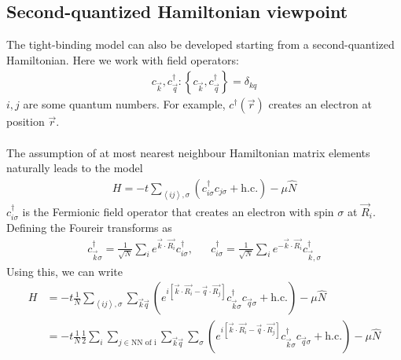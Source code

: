 \documentclass[12pt]{article}
\numberwithin{equation}{section}
\begin{document}
\subsection*{Second-quantized Hamiltonian viewpoint}
The tight-binding model can also be developed starting from a second-quantized Hamiltonian. Here we work with field operators:
\begin{equation}\begin{aligned}
	c_{\vec k}, c_{\vec q}^\dagger: \left\{ c_{\vec k}, c^\dagger_{\vec q} \right\} = \delta_{kq}
\end{aligned}\end{equation}
\(i,j\) are some quantum numbers. For example, \(c^\dagger(\vec r)\) creates an electron at position \(\vec r\).
\\\\
The assumption of at most nearest neighbour Hamiltonian matrix elements naturally leads to the model
\begin{equation}\begin{aligned}
	H = -t\sum_{\left<ij\right>, \sigma}\left(c^\dagger_{i \sigma}c_{j\sigma} + \text{h.c.}\right) - \mu \hat N
\end{aligned}\end{equation}
\(c^\dagger_{i\sigma}\) is the Fermionic field operator that creates an electron with spin \(\sigma\) at \(\vec R_i\). Defining the Foureir transforms as
\begin{equation}\begin{aligned}
	c^\dagger_{\vec k\sigma} = \frac{1}{\sqrt N}\sum_{i}e^{\vec{k}\cdot\vec{R_i}}c^\dagger_{i\sigma}, && c^\dagger_{i\sigma} = \frac{1}{\sqrt N}\sum_{i}e^{-\vec{k}\cdot\vec{R_i}}c^\dagger_{\vec k, \sigma}
\end{aligned}\end{equation}
Using this, we can write
\begin{equation}\begin{aligned}
	H &= -t \frac{1}{N} \sum_{\left<ij\right>, \sigma}\sum_{\vec k \vec q}\left(e^{i\left[\vec{k}\cdot\vec{ R_i} - \vec{q}\cdot\vec{ R_j}\right]}c^\dagger_{\vec k \sigma}c_{ \vec q\sigma} + \text{h.c.}\right) - \mu \hat N\\
	  &= -t \frac{1}{N} \frac{1}{2}\sum_{i}\sum_{j \in \text{NN of i}}\sum_{\vec k \vec q}\sum_\sigma\left(e^{i\left[\vec{k}\cdot\vec{ R_i} - \vec{q}\cdot\vec{ R_j}\right]}c^\dagger_{\vec k \sigma}c_{ \vec q\sigma} + \text{h.c.}\right) - \mu \hat N
\end{aligned}\end{equation}
\end{document}
